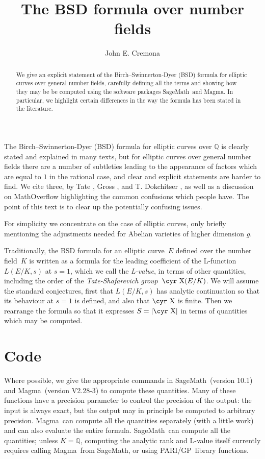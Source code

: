\documentclass{amsart}
\newcommand{\software}[1]{\textsf{#1}} %
\newcommand{\Sage}{\software{SageMath}}
\newcommand{\Magma}{\software{Magma}{}}
\newcommand{\GP}{\software{PARI/GP}{}}
\newcommand{\Sha}{\text{\cyr X}}
\newcommand\Q{\mathbb{Q}}
\begin{document}
\title{The BSD formula over number fields}
\author{John E. Cremona}

\begin{abstract}
  We give an explicit statement of the Birch--Swinnerton-Dyer (BSD)
  formula for elliptic curves over general number fields, carefully
  defining all the terms and showing how they may be be computed using
  the software packages \Sage\ and \Magma.  In particular, we highlight
  certain differences in the way the formula has been stated in the
  literature.
\end{abstract}

\maketitle

The Birch--Swinnerton-Dyer (BSD) formula for elliptic curves over
\(\Q\) is clearly stated and explained in many texts, but for elliptic
curves over general number fields there are a number of subtleties
leading to the appearance of factors which are equal to \(1\) in the
rational case, and clear and explicit statements are harder to
find. We cite three, by Tate \cite{Tate}, Gross \cite{Gross}, and
T. Dokchitser \cite{Dok}, as well as a discussion on MathOverflow
\cite{MO} highlighting the common confusions which people have. The
point of this text is to clear up the potentially confusing issues.

For simplicity we concentrate on the case of elliptic curves, only
briefly mentioning the adjustments needed for Abelian varieties of
higher dimension \(g\).

Traditionally, the BSD formula for an elliptic curve~$E$ defined over
the number field~$K$ is written as a formula for the leading
coefficient of the L-function \(L(E/K,s)\) at \(s=1\), which we call
the \emph{L-value}, in terms of other quantities, including the order
of the \emph{Tate-Shafarevich group}~$\Sha(E/K)$. We will assume the
standard conjectures, first that \(L(E/K,s)\) has analytic
continuation so that its behaviour at \(s=1\) is defined, and also
that $\Sha$ is finite. Then we rearrange the formula so that it
expresses \(S=|\Sha|\) in terms of quantities which may be computed.

\section{Code}\label{code}

Where possible, we give the appropriate commands in \Sage\ (version
10.1) and \Magma\ (version V2.28-3) to compute these quantities. Many
of these functions have a precision parameter to control the precision
of the output: the input is always exact, but the output may in
principle be computed to arbitrary precision. \Magma\ can compute all
the quantities separately (with a little work) and can also evaluate
the entire formula. \Sage\ can compute all the quantities; unless
\(K=\Q\), computing the analytic rank and L-value itself currently
requires calling \Magma\ from \Sage, or using \GP\ library functions.
\end{document}
